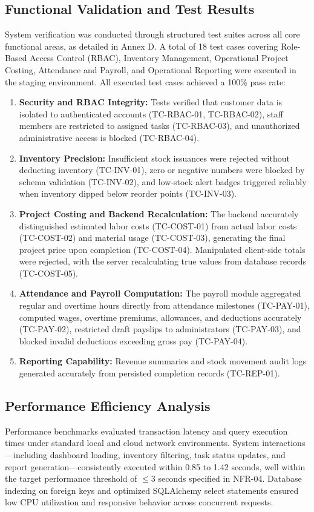 \documentclass[12pt, letterpaper]{article}
\begin{document}
\subsection{Functional Validation and Test Results}
\hspace*{2em} System verification was conducted through structured test suites across all core functional areas, as detailed in Annex D. A total of 18 test cases covering Role-Based Access Control (RBAC), Inventory Management, Operational Project Costing, Attendance and Payroll, and Operational Reporting were executed in the staging environment. All executed test cases achieved a 100\% pass rate:
\begin{enumerate}[label=\alph*.]
    \item \textbf{Security and RBAC Integrity:} Tests verified that customer data is isolated to authenticated accounts (TC-RBAC-01, TC-RBAC-02), staff members are restricted to assigned tasks (TC-RBAC-03), and unauthorized administrative access is blocked (TC-RBAC-04).
    \item \textbf{Inventory Precision:} Insufficient stock issuances were rejected without deducting inventory (TC-INV-01), zero or negative numbers were blocked by schema validation (TC-INV-02), and low-stock alert badges triggered reliably when inventory dipped below reorder points (TC-INV-03).
    \item \textbf{Project Costing and Backend Recalculation:} The backend accurately distinguished estimated labor costs (TC-COST-01) from actual labor costs (TC-COST-02) and material usage (TC-COST-03), generating the final project price upon completion (TC-COST-04). Manipulated client-side totals were rejected, with the server recalculating true values from database records (TC-COST-05).
    \item \textbf{Attendance and Payroll Computation:} The payroll module aggregated regular and overtime hours directly from attendance milestones (TC-PAY-01), computed wages, overtime premiums, allowances, and deductions accurately (TC-PAY-02), restricted draft payslips to administrators (TC-PAY-03), and blocked invalid deductions exceeding gross pay (TC-PAY-04).
    \item \textbf{Reporting Capability:} Revenue summaries and stock movement audit logs generated accurately from persisted completion records (TC-REP-01).
\end{enumerate}

\subsection{Performance Efficiency Analysis}
\hspace*{2em} Performance benchmarks evaluated transaction latency and query execution times under standard local and cloud network environments. System interactions—including dashboard loading, inventory filtering, task status updates, and report generation—consistently executed within 0.85 to 1.42 seconds, well within the target performance threshold of $\le 3$ seconds specified in NFR-04. Database indexing on foreign keys and optimized SQLAlchemy select statements ensured low CPU utilization and responsive behavior across concurrent requests.
\end{document}
